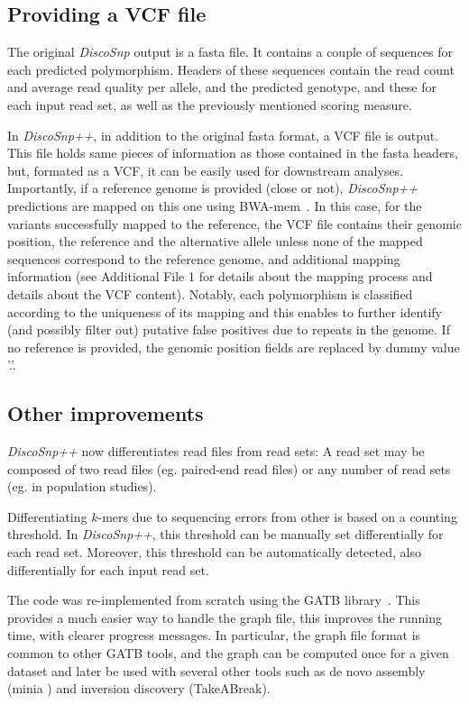 \documentclass{bmcart}
\newcommand{\disco}{{\it DiscoSnp}\xspace}
\newcommand{\discopp}{{\it DiscoSnp++}\xspace}
\begin{document}
\subsection*{Providing a VCF file}
The original \disco output is a fasta file. It contains a couple of sequences for each predicted polymorphism. Headers of these sequences contain the read count and average read quality per allele, and the predicted genotype, and these for each input read set, as well as the previously mentioned scoring measure.  

In \discopp, in addition to the original fasta format, a VCF file is output. This file holds same pieces of information as those contained in the fasta headers, but, formated as a VCF, it can be easily used for downstream analyses. 
Importantly, if a reference genome is provided (close or not), \discopp predictions are mapped on this one using BWA-mem~\cite{bwa}. In this case, for the variants successfully mapped to the reference, the VCF file contains their genomic position, the reference and the alternative allele unless none of the mapped sequences correspond to the reference genome, and additional mapping information (see Additional File 1 for details about the mapping process and details about the VCF content). Notably, each polymorphism is classified according to the uniqueness of its mapping and this enables to further identify (and possibly filter out) putative false positives due to repeats in the genome.
If no reference is provided, the genomic position fields are replaced by dummy value '.'.

\subsection*{Other improvements}
\discopp now differentiates read files from read sets: A read set may be composed of two read files (eg. paired-end read files) or any number of read sets (eg. in population studies). 

Differentiating $k$-mers due to sequencing errors from other is based on a counting threshold. In \discopp, this threshold can be manually set differentially for each read set. Moreover, this threshold can be automatically detected, also differentially for each input read set. 


The code was re-implemented from scratch using the GATB library~\cite{Drezen2014}. This provides a much easier way to handle the graph file, this improves the running time, with clearer progress messages. 
In particular, the graph file format is common to other GATB tools, and the graph can be computed once for a given dataset and later be used with several other tools such as de novo assembly (minia \cite{Chikhi2013}) and inversion discovery (TakeABreak\cite{lemaitre:hal-01063157}). 
\end{document}
